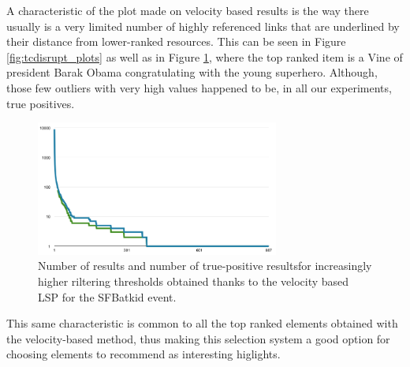 \documentclass{sig-alternate}
\begin{document}
A characteristic of the plot made on velocity based results is the way there usually is a very limited number of highly referenced links that are underlined by their distance from lower-ranked resources. This can be seen in Figure \ref{fig:tcdisrupt_plots} as well as in Figure \ref{fig:sfbatkid_plot}, where the top ranked item is a Vine of president Barak Obama congratulating with the young superhero. Although, those few outliers with very high values happened to be, in all our experiments, true positives.
\begin{figure}[htbp]
  \centering
  \includegraphics[width=8cm]{Figures/batkid_plot.png}
  \caption{Number of results and number of true-positive resultsfor increasingly higher riltering thresholds obtained thanks to the velocity based LSP for the SFBatkid event.}
  \label{fig:sfbatkid_plot}
\end{figure}

This same characteristic is common to all the top ranked elements obtained with the velocity-based method, thus making this selection system a good option for choosing elements to recommend as interesting higlights.
\end{document}
